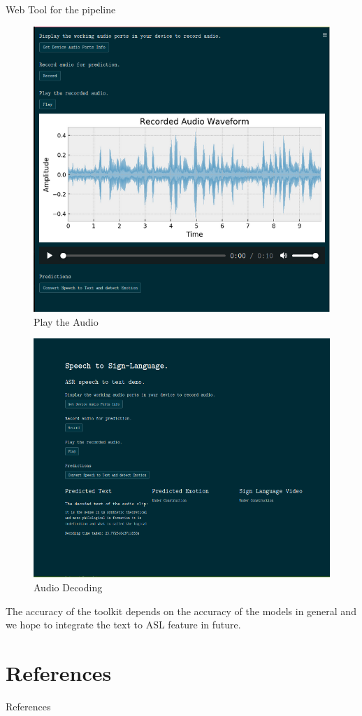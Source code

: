 \documentclass[10pt]{beamer}
\begin{document}
\begin{frame}{Web Tool for the pipeline}
\begin{minipage}{0.3\textwidth}
\begin{figure}
	\includegraphics[width=\textwidth]{images/streamlit_app2.png}
	\caption{Play the Audio}
\end{figure}
\end{minipage}
\begin{minipage}{0.35\textwidth}
\centering
\begin{figure}
	\includegraphics[width=\textwidth]{images/streamlit_app3.png}
	\caption{Audio Decoding}
\end{figure}
\end{minipage}

The accuracy of the toolkit depends on the accuracy of the models in general and we hope to integrate the text to ASL feature in future.
\end{frame}
		 
\section{References}
\begin{frame}{References}
	\tiny    
    \printbibliography
\end{frame}
\end{document}
